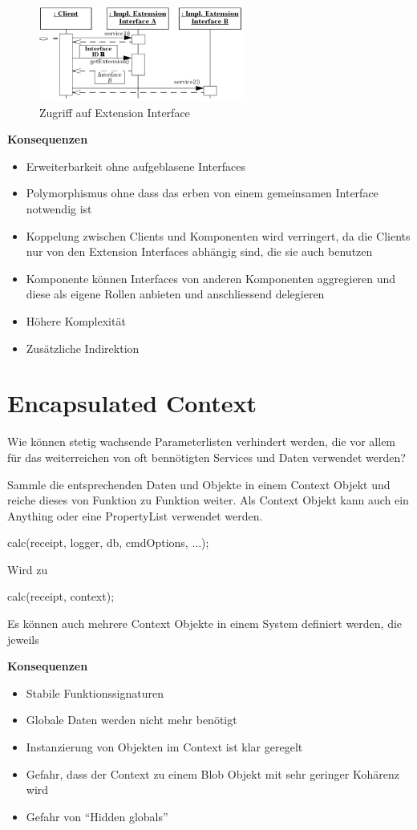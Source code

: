 \begin{figure}[H]
	\centering
	\includegraphics[width=0.6\textwidth]{content/advancedPatterns/extensioninterfaceusage.png}
	\caption{Zugriff auf Extension Interface}
\end{figure}

\textbf{Konsequenzen}

\begin{itemize}
	\item Erweiterbarkeit ohne aufgeblasene Interfaces
	\item Polymorphismus ohne dass das erben von einem gemeinsamen Interface notwendig ist
	\item Koppelung zwischen Clients und Komponenten wird verringert, da die Clients nur von den Extension Interfaces abhängig sind, die sie auch benutzen
	\item Komponente können Interfaces von anderen Komponenten aggregieren und diese als eigene Rollen anbieten und anschliessend delegieren
	\item Höhere Komplexität
	\item Zusätzliche Indirektion
\end{itemize}

\section{Encapsulated Context}

Wie können stetig wachsende Parameterlisten verhindert werden, die vor allem für das weiterreichen von oft bennötigten Services und Daten verwendet werden?

Sammle die entsprechenden Daten und Objekte in einem Context Objekt und reiche dieses von Funktion zu Funktion weiter. Als Context Objekt kann auch ein Anything oder eine PropertyList verwendet werden.

calc(receipt, logger, db, cmdOptions, ...);

Wird zu

calc(receipt, context);

Es können auch mehrere Context Objekte in einem System definiert werden, die jeweils 

\textbf{Konsequenzen}

\begin{itemize}
	\item Stabile Funktionssignaturen
	\item Globale Daten werden nicht mehr benötigt
	\item Instanzierung von Objekten im Context ist klar geregelt
	\item Gefahr, dass der Context zu einem Blob Objekt mit sehr geringer Kohärenz wird
	\item Gefahr von ``Hidden globals''
\end{itemize}